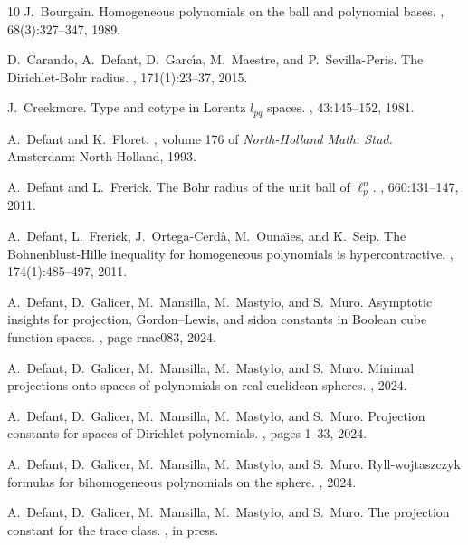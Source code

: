 \documentclass[12pt]{amsart}
\numberwithin{subsection}{section}
\theoremstyle{definition}
\theoremstyle{remark}
\begin{document}
\begin{thebibliography}{10}
J.~Bourgain.
\newblock Homogeneous polynomials on the ball and polynomial bases.
, 68(3):327--347, 1989.

D.~Carando, A.~Defant, D.~Garc{\'{\i}}a, M.~Maestre, and P.~Sevilla-Peris.
\newblock The {Dirichlet}-{Bohr} radius.
, 171(1):23--37, 2015.

J.~Creekmore.
\newblock Type and cotype in {Lorentz} $l_{pq}$ spaces.
, 43:145--152, 1981.

A.~Defant and K.~Floret.
, volume 176 of {\em North-Holland Math. Stud.}
\newblock Amsterdam: North-Holland, 1993.

A.~Defant and L.~Frerick.
\newblock The {Bohr} radius of the unit ball of {{\(\ell_p^n\)}}.
, 660:131--147, 2011.

A.~Defant, L.~Frerick, J.~Ortega-Cerd{\`a}, M.~Ouna{\"{\i}}es, and K.~Seip.
\newblock The {Bohnenblust}-{Hille} inequality for homogeneous polynomials is hypercontractive.
, 174(1):485--497, 2011.

A.~Defant, D.~Galicer, M.~Mansilla, M.~Masty{\l}o, and S.~Muro.
\newblock Asymptotic insights for projection, {G}ordon--{L}ewis, and sidon constants in {B}oolean cube function spaces.
, page rnae083, 2024.

A.~Defant, D.~Galicer, M.~Mansilla, M.~Masty{\l}o, and S.~Muro.
\newblock Minimal projections onto spaces of polynomials on real euclidean spheres.
, 2024.

A.~Defant, D.~Galicer, M.~Mansilla, M.~Masty{\l}o, and S.~Muro.
\newblock Projection constants for spaces of {D}irichlet polynomials.
, pages 1--33, 2024.

A.~Defant, D.~Galicer, M.~Mansilla, M.~Masty{\l}o, and S.~Muro.
\newblock Ryll-wojtaszczyk formulas for bihomogeneous polynomials on the sphere.
, 2024.

A.~Defant, D.~Galicer, M.~Mansilla, M.~Masty{\l}o, and S.~Muro.
\newblock The projection constant for the trace class.
, in press.


\end{thebibliography}
\end{document}
